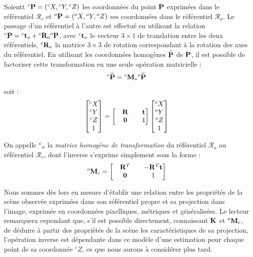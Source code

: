 Soientt ${}^c{\bf P} = ({}^cX, {}^cY, {}^cZ)$ les coordonnées du point ${\bf P}$ exprimées dans le référentiel $\mathcal R_c$ et ${}^o{\bf P} = ({}^oX, {}^oY, {}^oZ)$ ses coordonnées dans le référentiel $\mathcal R_o$. Le passage d'un référentiel à l'autre est effectué en utilisant la relation ${}^c{\bf P} = {}^c{\bf t}_o + {}^c{\bf R}_o {}^o{\bf P}$, avec ${}^c{\bf t}_o$ le vecteur $3\times 1$ de translation entre les deux référentiels, ${}^c{\bf R}_o$ la matrice $3\times 3$ de rotation correspondant à la rotation des axes du référentiel. En utilisant les coordonnées homogènes $\widetilde {\bf P}$ de ${\bf P}$, il est possible de factoriser cette transformation en une seule opération matricielle :
\begin{equation}
{}^c \widetilde {\bf P} = {}^c {\bf M}_o {}^o \widetilde {\bf P}
\label{intro:eq18}
\end{equation}
soit :
\begin{equation}
\begin{bmatrix}
{}^cX \\ {}^cY \\ {}^cZ \\ 1
\end{bmatrix}
=
\begin{bmatrix}
&  {\bf R} & & {\bf t} \\
& {\bf 0} & & 1
\end{bmatrix}
\begin{bmatrix}
{}^oX \\ {}^oY \\ {}^oZ \\ 1
\end{bmatrix}
\label{intro:eq19}
\end{equation}

On appelle ${}^c{\bf}_o$ la {\it matrice homogène de transformation} du référentiel $\mathcal R_o$ au référentiel $\mathcal R_c$, dont l'inverse s'exprime simplement sous la forme :
\begin{equation}
{}^o{\bf M}_c = 
\begin{bmatrix}
&  {\bf R}^T & & -{\bf R}^T {\bf t} \\
& {\bf 0} & & 1
\end{bmatrix}
\label{intro:eq20}
\end{equation}

Nous sommes dès lors en mesure d'établir une relation entre les propriétés de la scène observée exprimées dans son référentiel propre et sa projection dans l'image, exprimée en coordonnées pixelliques, métriques et généralisées. Le lecteur remarquera cependant que, s'il est possible directement, connaissant ${\bf K}$ et ${}^o{\bf M}_c$, de déduire à partir des propriétés de la scène les caractéristiques de sa projection, l'opération inverse est dépendante dans ce modèle d'une estimation pour chaque point de sa coordonnée ${}^cZ$, ce que nous aurons à considérer plus tard.

